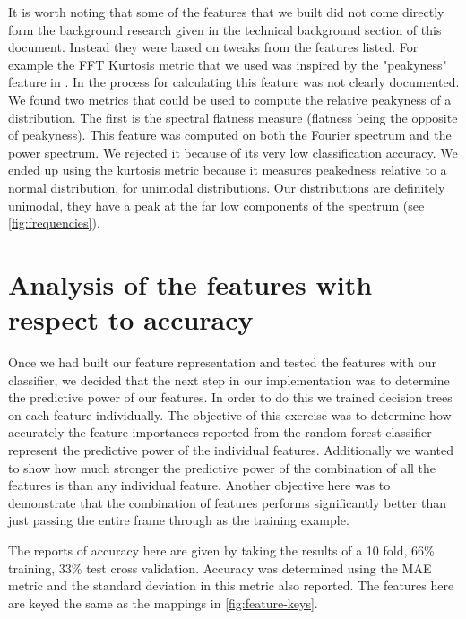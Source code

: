 \documentclass[ %
                    author={Sam Phippen},
                supervisor={Dr. Rafal Bogacz},
                     title={Real time voice activity detectors in noisy personal computing environments},
                  subtitle={},
                    degree={MEng},
                      year={2012} ]{thesis}
\begin{document}
It is worth noting that some of the features that we built did not come
directly form the background research given in the technical background section
of this document. Instead they were based on tweaks from the features listed.
For example the FFT Kurtosis metric that we used was inspired by the
"peakyness" feature in \cite{shin}. In \cite{shin} the process for calculating
this feature was not clearly documented. We found two metrics that could be
used to compute the relative peakyness of a distribution. The first is the
spectral flatness measure (flatness being the opposite of peakyness). This
feature was computed on both the Fourier spectrum and the power spectrum. We
rejected it because of its very low classification accuracy. We ended up using
the kurtosis metric because it measures peakedness relative to a normal
distribution, for unimodal distributions\cite{DeCarlo}. Our distributions are
definitely unimodal, they have a peak at the far low components of the spectrum
(see \ref{fig:frequencies}).

\section{Analysis of the features with respect to accuracy}

Once we had built our feature representation and tested the features with our
classifier, we decided that the next step in our implementation was to
determine the predictive power of our features. In order to do this we trained
decision trees on each feature individually. The objective of this exercise was
to determine how accurately the feature importances reported from the random
forest classifier represent the predictive power of the individual features.
Additionally we wanted to show how much stronger the predictive power of the
combination of all the features is than any individual feature. Another
objective here was to demonstrate that the combination of features performs
significantly better than just passing the entire frame through as the training
example.

The reports of accuracy here are given by taking the results of a 10 fold, 66\%
training, 33\% test cross validation. Accuracy was determined using the MAE
metric and the standard deviation in this metric also reported. The features
here are keyed the same as the mappings in \ref{fig:feature-keys}.
\end{document}
